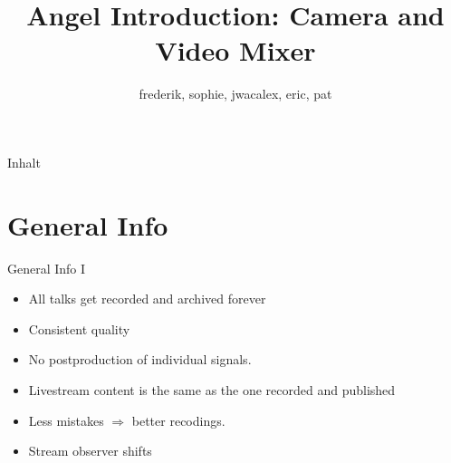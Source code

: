 \documentclass[aspectratio=169]{beamer}
\title{Angel Introduction: Camera and Video Mixer}
\author{frederik, sophie, jwacalex, eric, pat}
\institute{C3VOC}
\begin{document}

\maketitle

\begin{frame}{Inhalt}
\tableofcontents
\end{frame}


\newpage





\section{General Info}
\begin{frame}{General Info I}
	\begin{itemize}
		\item All talks get recorded and archived forever
		\item Consistent quality
		\item No postproduction of individual signals.
		\item Livestream content is the same as the one recorded and published
		\item Less mistakes $\Rightarrow$ better recodings.
		\item Stream observer shifts
	\end{itemize}
\end{frame}
\end{document}
